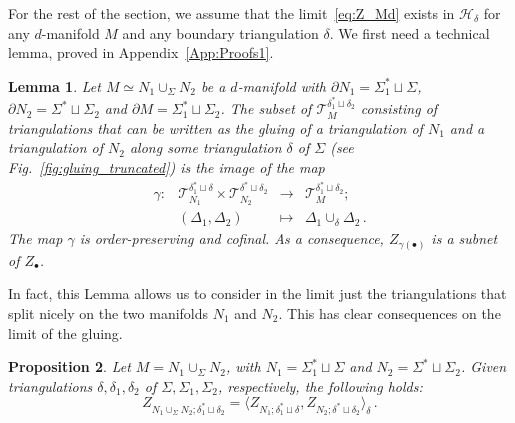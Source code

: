 \documentclass[11pt]{article}
\newtheorem{proposition}{Proposition}[section]
\newtheorem{lemma}[proposition]{Lemma}
\theoremstyle{definition}
\numberwithin{equation}{section}
\begin{document}
For the rest of the section, we assume that the limit~\eqref{eq:Z_Md} exists in $\mathcal H_\delta$ for any $d$-manifold $M$ and any boundary triangulation $\delta$. We first need a technical lemma, proved in Appendix~\ref{App:Proofs1}.
\begin{lemma}
    \label{lem:subnet}
    Let $ M\simeq N_1\cup_{\Sigma}N_2$ be a $d$-manifold with $\partial N_1=\Sigma_1^*\sqcup\Sigma$, $\partial N_2=\Sigma^*\sqcup\Sigma_2$ and $\partial  M=\Sigma_1^*\sqcup \Sigma_2$. The subset of $\mathcal{T}_{M}^{\delta_1^* \sqcup \delta_2}$ consisting of triangulations that can be written as the gluing of a triangulation of $N_1$ and a triangulation of $N_2$ along some triangulation $\delta$ of $\Sigma$ (see Fig.~\ref{fig:gluing_truncated}) is the image of the map
    \[
    \begin{matrix}
        \gamma: & \mathcal{T}_{N_1}^{\delta_1^* \sqcup \delta}\times \mathcal{T}_{N_2}^{\delta^* \sqcup \delta_2} & \to & \mathcal{T}_{M}^{\delta_1^* \sqcup \delta_2};\\
        & (\Delta_1,\Delta_2) & \mapsto & \Delta_1\cup_\delta \Delta_2 \,.
    \end{matrix}
    \]
    The map $\gamma$ is order-preserving and cofinal. As a consequence, $Z_{\gamma(\bullet)}$ is a subnet of $Z_{\bullet}$.
\end{lemma}
In fact, this Lemma allows us to consider in the limit just the triangulations that split nicely on the two manifolds $N_1$ and $N_2$. This has clear consequences on the limit of the gluing.
\begin{proposition} \label{prop:w-gluing}
    Let $M=N_1\cup_\Sigma N_2$, with $N_1=\Sigma_1^*\sqcup\Sigma$ and $N_2=\Sigma^*\sqcup\Sigma_2$. Given triangulations $\delta,\delta_1,\delta_2$ of $\Sigma,\Sigma_1,\Sigma_2$, respectively, the following holds:
    \begin{equation}
    \label{eq:gluing}
        Z_{N_1\cup_\Sigma N_2; \delta_1^* \sqcup \delta_2}= \langle Z_{N_1; \delta_1^* \sqcup \delta}, Z_{N_2; \delta^* \sqcup \delta_2} \rangle_\delta\,.
    \end{equation}
\end{proposition}
\end{document}
